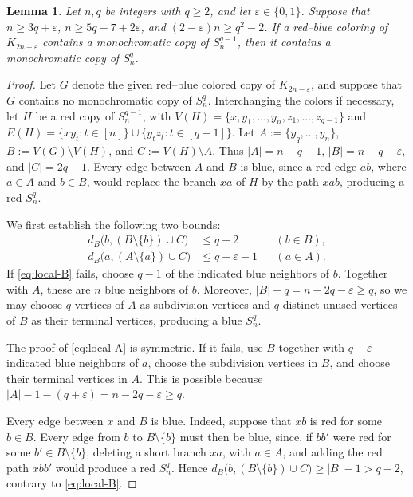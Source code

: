 \documentclass[11pt]{article}
\newtheorem{lemma}[theorem]{Lemma}
\theoremstyle{definition}
\theoremstyle{remark}
\begin{document}
\begin{lemma}\label{lem:one-step-subdivision}
Let \(n,q\) be integers with \(q\geq2\), and let
\(\varepsilon\in\{0,1\}\). Suppose that
\(n\geq3q+\varepsilon\), \(n\geq5q-7+2\varepsilon\), and \((2-\varepsilon)n\geq q^2-2\).
If a red--blue coloring of \(K_{2n-\varepsilon}\) contains a
monochromatic copy of \(S_n^{q-1}\), then it contains a
monochromatic copy of \(S_n^q\).
\end{lemma}

\begin{proof}
Let \(G\) denote the given red--blue colored copy of
\(K_{2n-\varepsilon}\), and suppose that \(G\) contains no
monochromatic copy of \(S_n^q\). Interchanging the colors if
necessary, let \(H\) be a red copy of \(S_n^{q-1}\), with
\(V(H)=\{x,y_1,\ldots,y_n,z_1,\ldots,z_{q-1}\}\) and
\(E(H)=\{xy_t:t\in[n]\}\cup\{y_tz_t:t\in[q-1]\}\).
Let \(A:=\{y_q,\ldots,y_n\}\), \(B:=V(G)\setminus V(H)\), and
\(C:=V(H)\setminus A\). Thus \(|A|=n-q+1\),
\(|B|=n-q-\varepsilon\), and \(|C|=2q-1\).
Every edge between \(A\) and \(B\) is blue, since a red edge
\(ab\), where \(a\in A\) and \(b\in B\), would replace the branch
\(xa\) of \(H\) by the path \(xab\), producing a red \(S_n^q\).

We first establish the following two bounds:
\begin{align}
 d_B\bigl(b,(B\setminus\{b\})\cup C\bigr)
 &\leq q-2
 &&(b\in B),\label{eq:local-B}\\
 d_B\bigl(a,(A\setminus\{a\})\cup C\bigr)
 &\leq q+\varepsilon-1
 &&(a\in A).\label{eq:local-A}
\end{align}
If \eqref{eq:local-B} fails, choose \(q-1\) of the indicated blue
neighbors of \(b\). Together with \(A\), these are \(n\)
blue neighbors of \(b\). Moreover,
\(|B|-q=n-2q-\varepsilon\geq q\), so we may choose \(q\) vertices
of \(A\) as subdivision vertices
and \(q\) distinct unused vertices of \(B\) as their terminal
vertices, producing a blue \(S_n^q\).

The proof of \eqref{eq:local-A} is symmetric. If it fails, use
\(B\) together with \(q+\varepsilon\) indicated blue neighbors of
\(a\), choose the subdivision vertices in \(B\), and choose their
terminal vertices in \(A\). This is possible because
\(|A|-1-(q+\varepsilon)=n-2q-\varepsilon\geq q\).

Every edge between \(x\) and \(B\) is blue. Indeed, suppose that
\(xb\) is red for some \(b\in B\). Every edge from \(b\) to
\(B\setminus\{b\}\) must then be blue, since, if \(bb'\) were red for some \(b'\in B\setminus\{b\}\),
deleting a short branch \(xa\), with \(a\in A\), and adding
the red path \(xbb'\) would produce a red \(S_n^q\). Hence
\(d_B\bigl(b,(B\setminus\{b\})\cup C\bigr)\geq |B|-1>q-2\),
contrary to \eqref{eq:local-B}.


\end{proof}
\end{document}
